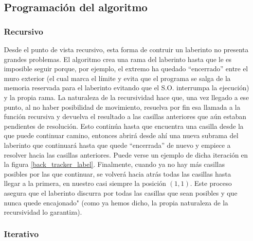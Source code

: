 \documentclass[12pt,a4paper]{article}
\begin{document}
\subsection{Programación del algoritmo}
\subsubsection{Recursivo}

Desde el punto de vista recursivo, esta forma de contruir un laberinto no presenta grandes problemas. El algoritmo crea una rama del laberinto hasta que le es imposible seguir porque, por ejemplo, el extremo ha quedado ``encerrado'' entre el muro exterior (el cual marca el límite y evita que el programa se salga de la memoria reservada para el laberinto evitando que el S.O. interrumpa la ejecución) y la propia rama. La naturaleza de la recursividad hace que, una vez llegado a ese punto, al no haber posibilidad de movimiento, resuelva por fin esa llamada a la función recursiva y devuelva el resultado a las casillas anteriores que aún estaban pendientes de resolución.  Esto continúa hasta que encuentra una casilla desde la que puede continuar camino, entonces abrirá desde ahí una nueva subrama del laberinto que continuará hasta que quede ``encerrada'' de nuevo y empiece a resolver hacia las casillas anteriores. Puede verse un ejemplo de dicha iteración en la figura \ref{back_tracker_label}. Finalmente, cuando ya no hay más casillas posibles por las que continuar, se volverá hacia atrás todas las casillas hasta llegar a la primera, en nuestro casi siempre la posición $(1,1)$. Este proceso asegura que el laberinto discurra por todas las casillas que sean posibles y que nunca quede encajonado" (como ya hemos dicho, la propia naturaleza de la recursividad lo garantiza).

\subsubsection{Iterativo}
\end{document}

